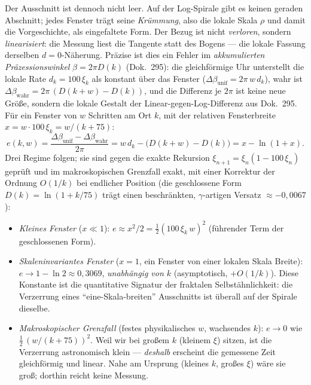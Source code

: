 Der Ausschnitt ist dennoch nicht leer. Auf der Log-Spirale gibt es keinen geraden
Abschnitt; jedes Fenster trägt seine \emph{Krümmung}, also die lokale Skala $\rho$ und
damit die Vorgeschichte, als eingefaltete Form. Der Bezug ist nicht \emph{verloren},
sondern \emph{linearisiert}: die Messung liest die Tangente statt des Bogens --- die lokale
Fassung derselben $d=0$-Näherung. Präzise ist dies ein Fehler im \emph{akkumulierten
Präzessionswinkel} $\beta = 2\pi D(k)$ (Dok.~295): die gleichförmige Uhr unterstellt die
lokale Rate $d_k = 100\,\xi_k$ als konstant über das Fenster ($\Delta\beta_{\text{unif}} =
2\pi\,w\,d_k$), wahr ist $\Delta\beta_{\text{wahr}} = 2\pi\,(D(k{+}w)-D(k))$, und die
Differenz je $2\pi$ ist keine neue Größe, sondern die lokale Gestalt der
Linear-gegen-Log-Differenz aus Dok.~295. Für ein Fenster von $w$ Schritten am Ort $k$, mit
der relativen Fensterbreite $x = w\cdot 100\,\xi_k = w/(k+75)$:
\begin{equation}
e(k,w) = \frac{\Delta\beta_{\text{unif}} - \Delta\beta_{\text{wahr}}}{2\pi}
       = w\,d_k - \big(D(k{+}w)-D(k)\big) = x - \ln(1+x).
\end{equation}
Drei Regime folgen; sie sind gegen die exakte Rekursion $\xi_{n+1}=\xi_n(1-100\,\xi_n)$
geprüft und im makroskopischen Grenzfall exakt, mit einer Korrektur der Ordnung $O(1/k)$ bei
endlicher Position (die geschlossene Form $D(k)=\ln(1+k/75)$ trägt einen beschränkten,
$\gamma$-artigen Versatz $\approx-0{,}0067$):
\begin{itemize}
\item \emph{Kleines Fenster} ($x\ll1$): $e \approx x^2/2 = \tfrac12(100\,\xi_k\,w)^2$
(führender Term der geschlossenen Form).
\item \emph{Skaleninvariantes Fenster} ($x=1$, ein Fenster von einer lokalen Skala Breite):
$e \to 1-\ln 2 \approx 0{,}3069$, \emph{unabhängig von $k$} (asymptotisch, $+O(1/k)$). Diese
Konstante ist die quantitative Signatur der fraktalen Selbstähnlichkeit: die Verzerrung eines
\enquote{eine-Skala-breiten} Ausschnitts ist überall auf der Spirale dieselbe.
\item \emph{Makroskopischer Grenzfall} (festes physikalisches $w$, wachsendes $k$):
$e \to 0$ wie $\tfrac12\,(w/(k+75))^2$. Weil wir bei großem $k$ (kleinem $\xi$) sitzen, ist
die Verzerrung astronomisch klein --- \emph{deshalb} erscheint die gemessene Zeit
gleichförmig und linear. Nahe am Ursprung (kleines $k$, großes $\xi$) wäre sie groß;
dorthin reicht keine Messung.
\end{itemize}

